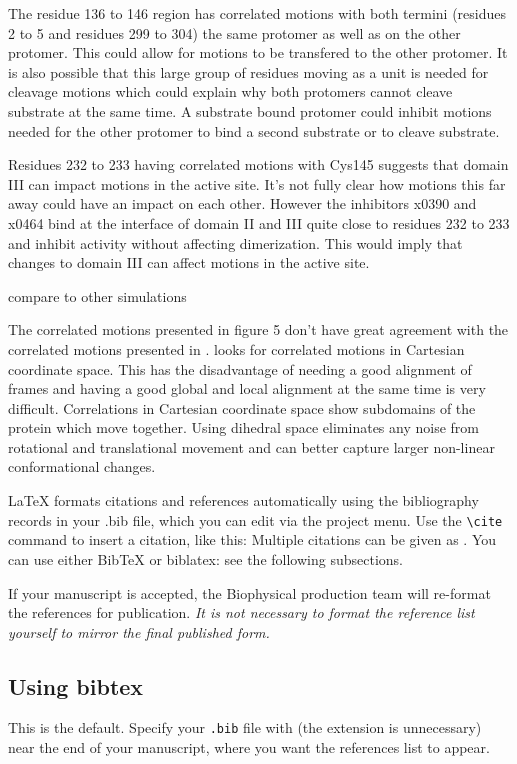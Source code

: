 \documentclass{biophys-new}
\begin{document}
The residue 136 to 146 region has correlated motions with both termini (residues 2 to 5 and residues 299 to 304) the same protomer as well as on the other protomer. This could allow for motions to be transfered to the other protomer. It is also possible that this large group of residues moving as a unit is needed for cleavage motions which could explain why both protomers cannot cleave substrate at the same time. A substrate bound protomer could inhibit motions needed for the other protomer to bind a second substrate or to cleave substrate.

Residues 232 to 233 having correlated motions with Cys145 suggests that domain III can impact motions in the active site. It's not fully clear how motions this far away could have an impact on each other. However the inhibitors x0390 and x0464 bind at the interface of domain II and III quite close to residues 232 to 233 and inhibit activity without affecting dimerization. \cite{el2020allosteric} This would imply that changes to domain III can affect motions in the active site.

compare to other simulations

The correlated motions presented in figure 5 don't have great agreement with the correlated motions presented in \cite{sztain2020elucidation}. \cite{sztain2020elucidation} looks for correlated motions in Cartesian coordinate space. This has the disadvantage of needing a good alignment of frames and having a good global and local alignment at the same time is very difficult. Correlations in Cartesian coordinate space show subdomains of the protein which move together. Using dihedral space eliminates any noise from rotational and translational movement and can better capture larger non-linear conformational changes.

\LaTeX{} formats citations and references automatically using the bibliography records in your .bib file, which you can edit via the project menu. Use the \verb|\cite| command to insert a citation, like this: \cite{Chen_Nicholson00} Multiple citations can be given as \cite{Stiles_Bartol01,el-Kareh_etal93,Callaghan91}. You can use either BibTeX or biblatex: see the following subsections.

If your manuscript is accepted, the Biophysical production team will re-format the references for publication. \emph{It is not necessary to format the reference list yourself to mirror the final published form.}

\subsection*{Using bibtex} 
This is the default. Specify your \texttt{.bib} file with \verb|| (the extension is unnecessary) near the end of your manuscript, where you want the references list to appear.
\end{document}
